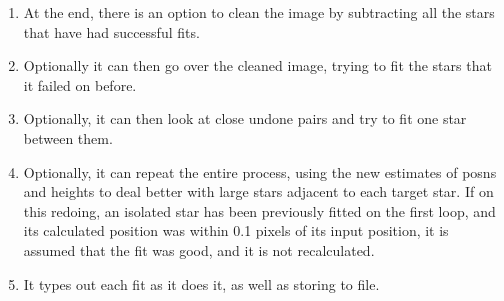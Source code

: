 \begin{small}
{{\begin{enumerate}
   The result for the target star is typed out and also stored.
 
   Thus this is the stage at which the actual measurement occurs.
 
   It will be noted that stars, if any,  which are not in the input list
   are neither fitted, nor taken into account when fitting other stars.
 
 \item At the end, there is an option to clean the image by subtracting all
   the stars that have had successful fits.
 
 \item Optionally it can then go over the cleaned image, trying to fit the
    stars that it failed on before.
 
 \item Optionally, it can then look at close undone pairs and try to fit
    one star between them.
 
 \item Optionally, it can repeat the entire process, using the new
    estimates of posns and heights to deal better with large stars adjacent
    to each target star. If on this redoing, an isolated star has been
    previously fitted on the first loop, and its calculated position was
    within 0.1 pixels of its input position, it is assumed that the fit was
    good, and it is not recalculated.
 
 \item It types out each fit as it does it, as well as storing to file.
\end{enumerate}
 
}}
\end{small}
